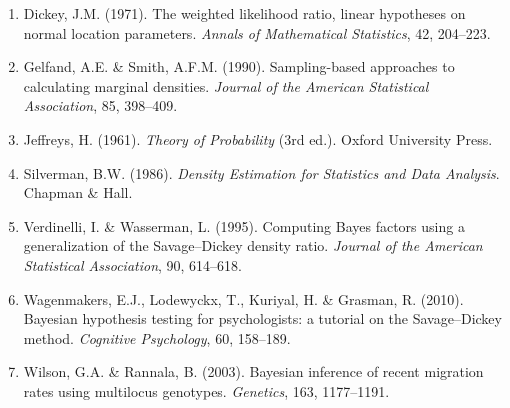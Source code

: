 \documentclass[11pt,a4paper]{article}
\newcommand{\1}{\mathbf{1}}
\begin{document}
\begin{enumerate}
\item Dickey, J.M. (1971). The weighted likelihood ratio, linear hypotheses on normal location parameters. \emph{Annals of Mathematical Statistics}, 42, 204--223.
\item Gelfand, A.E. \& Smith, A.F.M. (1990). Sampling-based approaches to calculating marginal densities. \emph{Journal of the American Statistical Association}, 85, 398--409.
\item Jeffreys, H. (1961). \emph{Theory of Probability} (3rd ed.). Oxford University Press.
\item Silverman, B.W. (1986). \emph{Density Estimation for Statistics and Data Analysis}. Chapman \& Hall.
\item Verdinelli, I. \& Wasserman, L. (1995). Computing Bayes factors using a generalization of the Savage--Dickey density ratio. \emph{Journal of the American Statistical Association}, 90, 614--618.
\item Wagenmakers, E.J., Lodewyckx, T., Kuriyal, H. \& Grasman, R. (2010). Bayesian hypothesis testing for psychologists: a tutorial on the Savage--Dickey method. \emph{Cognitive Psychology}, 60, 158--189.
\item Wilson, G.A. \& Rannala, B. (2003). Bayesian inference of recent migration rates using multilocus genotypes. \emph{Genetics}, 163, 1177--1191.
\end{enumerate}
\end{document}
